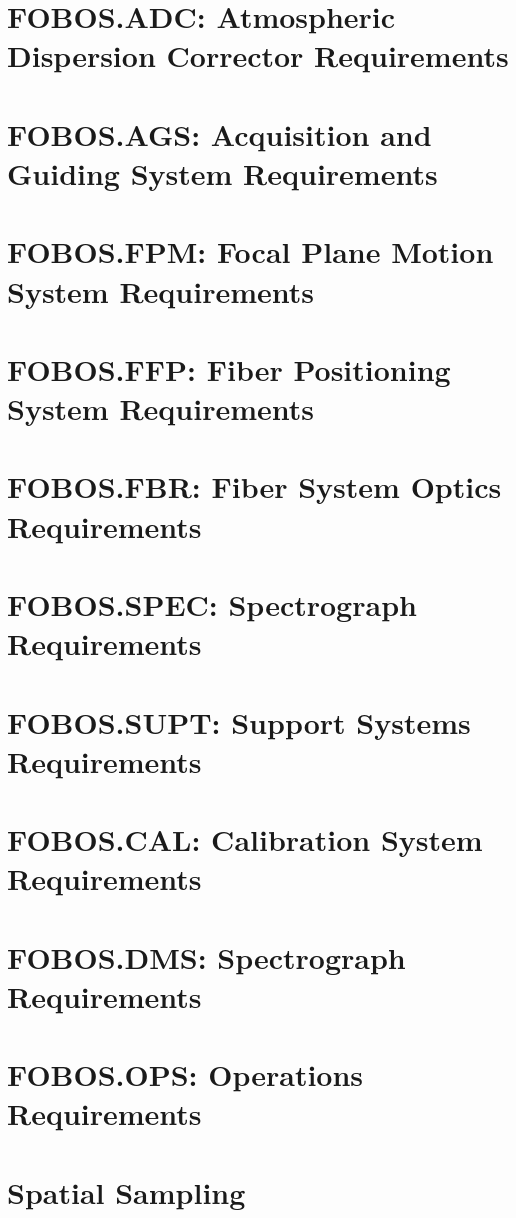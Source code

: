 \documentclass[11pt,a4paper,twoside,onecolumn,openany,final,oldfontcommands]{memoir}
\begin{document}
\section{FOBOS.ADC: Atmospheric Dispersion Corrector Requirements}

\section{FOBOS.AGS: Acquisition and Guiding System Requirements}

\section{FOBOS.FPM: Focal Plane Motion System Requirements}

\section{FOBOS.FFP: Fiber Positioning System Requirements}

\section{FOBOS.FBR: Fiber System Optics Requirements}

\section{FOBOS.SPEC: Spectrograph Requirements}
\section{FOBOS.SUPT: Support Systems Requirements}
\section{FOBOS.CAL: Calibration System Requirements}
\section{FOBOS.DMS: Spectrograph Requirements}
\section{FOBOS.OPS: Operations Requirements}

\section{Spatial Sampling}
\end{document}
